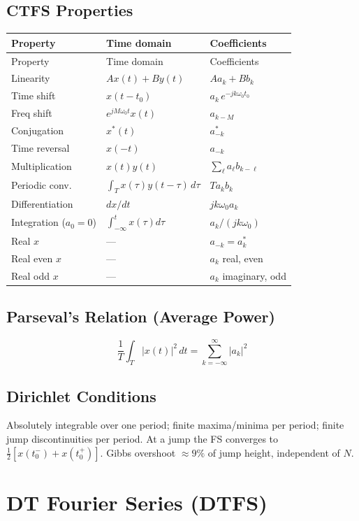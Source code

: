 \documentclass[10pt]{article}
\begin{document}
\subsection{CTFS Properties}
\begin{longtable}{@{}lll@{}}
\toprule
Property & Time domain & Coefficients \\
\midrule \endfirsthead
\toprule Property & Time domain & Coefficients \\ \midrule \endhead
\bottomrule \endfoot
Linearity & $Ax(t) + By(t)$ & $Aa_k + Bb_k$ \\
Time shift & $x(t - t_0)$ & $a_k\,e^{-jk\omega_0 t_0}$ \\
Freq shift & $e^{jM\omega_0 t} x(t)$ & $a_{k-M}$ \\
Conjugation & $x^*(t)$ & $a_{-k}^*$ \\
Time reversal & $x(-t)$ & $a_{-k}$ \\
Multiplication & $x(t)y(t)$ & $\sum_\ell a_\ell b_{k-\ell}$ \\
Periodic conv. & $\int_T x(\tau)y(t-\tau)\,d\tau$ & $T a_k b_k$ \\
Differentiation & $dx/dt$ & $jk\omega_0 a_k$ \\
Integration ($a_0=0$) & $\int_{-\infty}^t x(\tau)d\tau$ & $a_k/(jk\omega_0)$ \\
Real $x$ & --- & $a_{-k} = a_k^*$ \\
Real even $x$ & --- & $a_k$ real, even \\
Real odd $x$ & --- & $a_k$ imaginary, odd \\
\end{longtable}

\subsection{Parseval's Relation (Average Power)}
\[
\frac{1}{T}\int_T |x(t)|^2\,dt = \sum_{k=-\infty}^{\infty}|a_k|^2
\]

\subsection{Dirichlet Conditions}
Absolutely integrable over one period; finite maxima/minima per period; finite jump discontinuities per period. At a jump the FS converges to $\tfrac{1}{2}[x(t_0^-) + x(t_0^+)]$. Gibbs overshoot $\approx 9\%$ of jump height, independent of $N$.

\section{DT Fourier Series (DTFS)}
\end{document}
